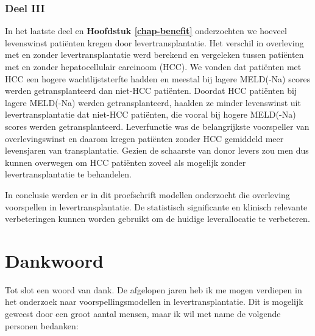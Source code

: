 \documentclass[11pt,english,]{book} %
\begin{document}
\hypertarget{deel-iii}{%
\subsection*{Deel III}\label{deel-iii}}

In het laatste deel en \textbf{Hoofdstuk \ref{chap-benefit}} onderzochten we hoeveel levenswinst patiënten kregen door levertransplantatie. Het verschil in overleving met en zonder levertransplantatie werd berekend en vergeleken tussen patiënten met en zonder hepatocellulair carcinoom (HCC). We vonden dat patiënten met HCC een hogere wachtlijststerfte hadden en meestal bij lagere MELD(-Na) scores werden getransplanteerd dan niet-HCC patiënten. Doordat HCC patiënten bij lagere MELD(-Na) werden getransplanteerd, haalden ze minder levenswinst uit levertransplantatie dat niet-HCC patiënten, die vooral bij hogere MELD(-Na) scores werden getransplanteerd. Leverfunctie was de belangrijkste voorspeller van overlevingswinst en daarom kregen patiënten zonder HCC gemiddeld meer levensjaren van transplantatie. Gezien de schaarste van donor levers zou men dus kunnen overwegen om HCC patiënten zoveel als mogelijk zonder levertransplantatie te behandelen.

In conclusie werden er in dit proefschrift modellen onderzocht die overleving voorspellen in levertransplantatie. De statistisch significante en klinisch relevante verbeteringen kunnen worden gebruikt om de huidige leverallocatie te verbeteren.

\newpage
\thispagestyle{plain}

\mbox{}

\pagecolor{black}
\color{white}

\hypertarget{dankwoord}{%
\chapter*{Dankwoord}\label{dankwoord}}


\newpage
\nopagecolor
\color{black}
\hyphenchar{}

Tot slot een woord van dank. De afgelopen jaren heb ik me mogen verdiepen in het onderzoek naar voorspellingsmodellen in levertransplantatie. Dit is mogelijk geweest door een groot aantal mensen, maar ik wil met name de volgende personen bedanken:
\end{document}

